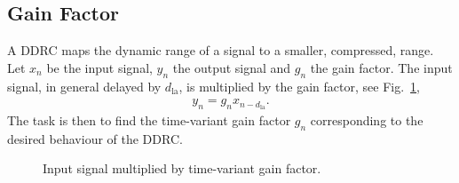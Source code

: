 \documentclass[../main2.tex]{subfiles}
\providecommand{\rootdir}{..}
\begin{document}
\subsection{Gain Factor}
A DDRC maps the dynamic range of a signal to a smaller, compressed, range. Let $x_n$ be the input signal, $y_n$ the output signal and $g_n$ the gain factor. The input signal, in general delayed by $d_\text{la}$, is multiplied by the gain factor, see Fig.~\ref{fig:block_gain},
\begin{align}
y_n = g_nx_{n-d_\text{la}}.
\label{eq:gainfactor}
\end{align}
The task is then to find the time-variant gain factor $g_n$ corresponding to the desired behaviour of the DDRC. 
\begin{figure}[h]
\centerline{}
\caption{Input signal multiplied by time-variant gain factor.}
\label{fig:block_gain}
\end{figure}
\end{document}

